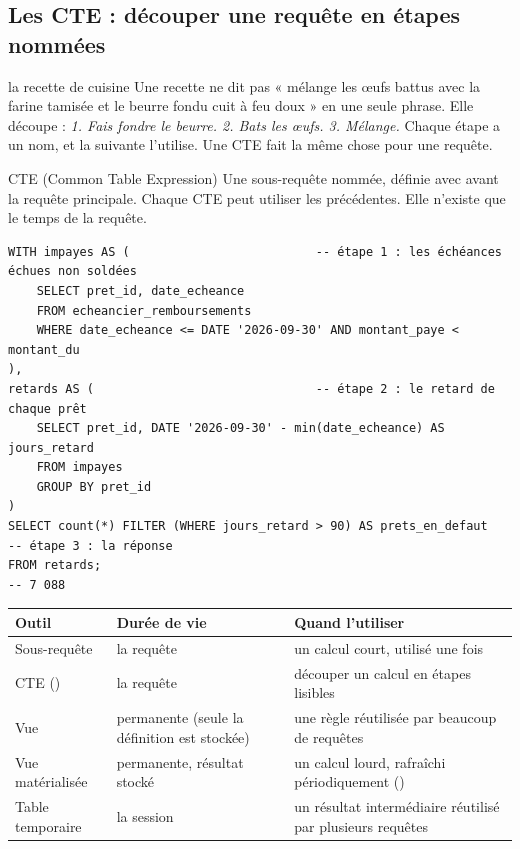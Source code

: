 \subsection{Les CTE : découper une requête en étapes nommées}

\begin{analogie}{la recette de cuisine}
Une recette ne dit pas « mélange les œufs battus avec la farine tamisée et le beurre fondu cuit à feu
doux » en une seule phrase. Elle découpe : \emph{1. Fais fondre le beurre. 2. Bats les œufs.
3. Mélange.} Chaque étape a un nom, et la suivante l'utilise. Une CTE fait la même chose pour une
requête.
\end{analogie}

\begin{definition}{CTE (Common Table Expression)}
Une sous-requête nommée, définie avec  avant la requête principale. Chaque CTE
peut utiliser les précédentes. Elle n'existe que le temps de la requête.
\end{definition}

\begin{lstlisting}[style=sql]
WITH impayes AS (                          -- étape 1 : les échéances échues non soldées
    SELECT pret_id, date_echeance
    FROM echeancier_remboursements
    WHERE date_echeance <= DATE '2026-09-30' AND montant_paye < montant_du
),
retards AS (                               -- étape 2 : le retard de chaque prêt
    SELECT pret_id, DATE '2026-09-30' - min(date_echeance) AS jours_retard
    FROM impayes
    GROUP BY pret_id
)
SELECT count(*) FILTER (WHERE jours_retard > 90) AS prets_en_defaut   -- étape 3 : la réponse
FROM retards;                                                         -- 7 088
\end{lstlisting}

\begin{center}\small
\begin{tabularx}{\linewidth}{@{}P{3cm} L L@{}}
\toprule
\textbf{Outil} & \textbf{Durée de vie} & \textbf{Quand l'utiliser} \\
\midrule
Sous-requête & la requête & un calcul court, utilisé une fois \\
CTE () & la requête & découper un calcul en étapes lisibles \\
Vue & permanente (seule la définition est stockée) & une règle réutilisée par beaucoup de requêtes \\
Vue matérialisée & permanente, résultat stocké & un calcul lourd, rafraîchi périodiquement
() \\
Table temporaire & la session & un résultat intermédiaire réutilisé par plusieurs requêtes \\
\bottomrule
\end{tabularx}
\end{center}

